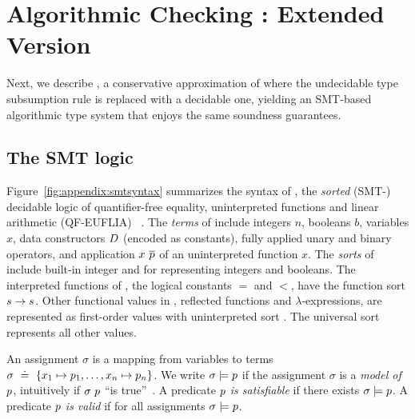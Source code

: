 \section{Algorithmic Checking \smtlan: Extended Version}
\label{sec:appendix:algorithmic}

Next, we describe \smtlan, a conservative approximation
of \corelan where the undecidable type subsumption rule
is replaced with a decidable one, yielding an SMT-based
algorithmic type system that enjoys the same soundness
guarantees.

\subsection{The SMT logic \smtlan}



%
Figure~\ref{fig:appendix:smtsyntax} summarizes the syntax
of \smtlan, the \emph{sorted} (SMT-)
decidable logic of quantifier-free equality,
uninterpreted functions and linear
arithmetic (QF-EUFLIA) ~\citep{Nelson81,SMTLIB2}.
%
The \emph{terms} of \smtlan include
integers $n$,
booleans $b$,
variables $x$,
data constructors $D$ (encoded as constants),
fully applied unary \unop and binary \binop operators,
and application $x\ \overline{p}$ of an uninterpreted function $x$.
%
The \emph{sorts} of \smtlan include built-in
integer \tint and \tbool for representing
integers and booleans.
%
The interpreted functions of \smtlan, \eg
the logical constants $=$ and $<$,
have the function sort $s \rightarrow s$.
%
Other functional values in \corelan, \eg
reflected \corelan functions and
$\lambda$-expressions, are represented as
first-order values with
uninterpreted sort \tsmtfun{\sort}{\sort}.
%
The universal sort \tuniv represents all other values.

%
An assignment $\sigma$ is a mapping from
variables to terms
%
${\sigma \defeq \{ \assignto{x_1}{\pred_1}, \ldots, \assignto{x_n}{\pred_n} \}}$.
%
We write
%
${\sigma \models p}$
%
if the assignment $\sigma$ is a
\emph{model of} $p$, intuitively
if $\sigma\ p$ ``is true''~\cite{Nelson81}.
%
A predicate $p$ \emph{is satisfiable} if
there exists ${\sigma\models p}$.
%
A predicate $p$ \emph{is valid} if
for all assignments ${\sigma\models p}$.


